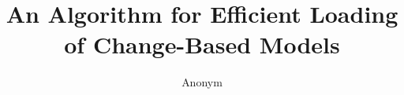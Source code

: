 \documentclass{llncs}
\begin{document}
\renewcommand{\thelstlisting}{\arabic{lstlisting}}
\renewcommand{\labelitemi}{$\bullet$}
\newcommand{\dk}[1]{\textbf{[DK: #1]}}

\title{An Algorithm for Efficient Loading \\ of Change-Based Models}
%
%
\author{
    Anonym%
}
%
%
%

\end{document}
